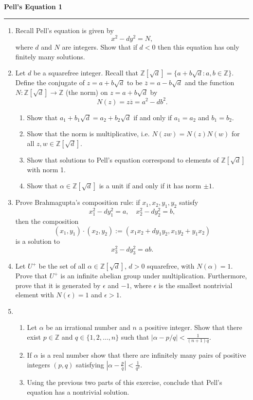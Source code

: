 \documentclass[12pt]{article}
\newcommand{\integers}{\mathbb{Z}}
\begin{document}
\begin{center}
{\bf \Large Pell's Equation 1}
\vspace{0.2cm}
\hrule
\end{center}

\begin{enumerate}
	\item Recall Pell's equation is given by
	\[
	x^2-dy^2 = N,
	\]
	where $d$ and $N$ are integers. Show that if $d<0$ then this equation has only finitely many solutions.
	\vfill
	\item Let $d$ be a squarefree integer. Recall that $\integers[\sqrt{d}] = \{a + b\sqrt{d}: a,b\in \integers\}$. Define the conjugate of $z = a+b\sqrt{d}$ to be $\overline{z} = a-b\sqrt{d}$ and the function $N: \integers[\sqrt{d}]\to \integers$ (the norm) on $z=a+b\sqrt{d}$ by
	\[
	N(z) = z\overline{z} = a^2 - db^2.
	\]
	\begin{enumerate}
		\item Show that $a_1+b_1\sqrt{d} = a_2+b_2\sqrt{d}$ if and only if $a_1=a_2$ and $b_1 = b_2$.
		\vfill
		\item Show that the norm is multiplicative, i.e. $N(zw) = N(z)N(w)$ for all $z,w\in \integers[\sqrt{d}]$.
		\vfill
		\item Show that solutions to Pell's equation correspond to elements of $\integers[\sqrt{d}]$ with norm 1.
		\vfill
		\item Show that $\alpha \in \integers[\sqrt{d}]$ is a unit if and only if it has norm $\pm 1$.
		\vfill
	\end{enumerate}
	\vfill
	\item Prove Brahmagupta's composition rule: if $x_1, x_2, y_1, y_2$ satisfy
	\[
	x_1^2-dy_1^2 = a,\quad x_2^2-dy_2^2 = b,
	\]
	then the composition
	\[
	(x_1, y_1)\cdot (x_2, y_2):= (x_1x_2+dy_1y_2, x_1y_2+y_1x_2)
	\]
	is a solution to
	\[
	x_3^2 -dy_3^2 = ab.
	\]
	\vfill

	\item Let $U^+$ be the set of all $\alpha \in \integers[\sqrt{d}]$, $d>0$ squarefree, with $N(\alpha) = 1$. Prove that $U^+$ is an infinite abelian group under multiplication. Furthermore, prove that it is generated by $\epsilon$ and $-1$, where $\epsilon$ is the smallest nontrivial element with $N(\epsilon) = 1$ and $\epsilon>1$. 
	\vfill\null\pagebreak

	\item \begin{enumerate}
		\item Let $\alpha$ be an irrational number and $n$ a positive integer. Show that there exist $p\in \integers$ and $q\in \{1, 2, \ldots, n\}$ such that $|\alpha - p/q| < \frac{1}{(n+1)q}$.
		\vfill
		\item If $\alpha$ is a real number show that there are infinitely many pairs of positive integers $(p, q)$ satisfying $|\alpha-\frac{p}{q}|<\frac{1}{q^2}$.
		\vfill
		\item Using the previous two parts of this exercise, conclude that Pell's equation has a nontrivial solution.
		\vfill
	\end{enumerate}
\end{enumerate}
\end{document}
